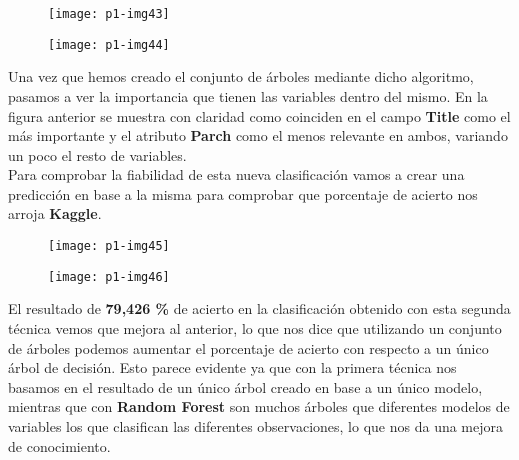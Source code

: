 \documentclass[10pt]{article}
\begin{document}
\begin{figure}[H]
	\begin{center}
 		\texttt{[image: p1-img43]}
	\end{center} 
\end{figure} 

\begin{figure}[H]
	\begin{center}
 		\texttt{[image: p1-img44]}
	\end{center} 
\end{figure} 

Una vez que hemos creado el conjunto de árboles mediante dicho algoritmo, pasamos a ver la importancia que tienen las variables dentro del mismo. En la figura anterior se muestra con claridad como coinciden en el campo \textbf{Title} como el más importante y el atributo \textbf{Parch} como el menos relevante en ambos, variando un poco el resto de variables. \\

Para comprobar la fiabilidad de esta nueva clasificación vamos a crear una predicción en base a la misma para comprobar que porcentaje de acierto nos arroja \textbf{Kaggle}. \\

\begin{figure}[H]
	\begin{center}
 		\texttt{[image: p1-img45]}
	\end{center} 
\end{figure} 

\begin{figure}[H]
	\begin{center}
 		\texttt{[image: p1-img46]}
	\end{center} 
\end{figure} 

El resultado de \textbf{79,426 \%} de acierto en la clasificación obtenido con esta segunda técnica vemos que mejora al anterior, lo que nos dice que utilizando un conjunto de árboles podemos aumentar el porcentaje de acierto con respecto a un único árbol de decisión. Esto parece evidente ya que con la primera técnica nos basamos en el resultado de un único árbol creado en base a un único modelo, mientras que con \textbf{Random Forest} son muchos árboles que diferentes modelos de variables los que clasifican las diferentes observaciones, lo que nos da una mejora de conocimiento. \\
\end{document}
